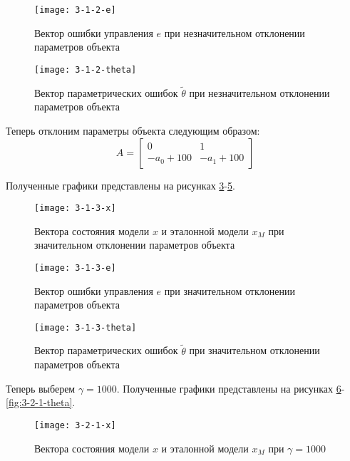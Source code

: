 \documentclass[14pt, a4paper]{extarticle}
\begin{document}
\begin{enumerate}
		\begin{figure}[H]
			\centering
			\texttt{[image: 3-1-2-e]}
			\caption{Вектор ошибки управления $e$ при незначительном отклонении параметров объекта}
			\label{fig:3-1-2-e}
		\end{figure}
		
		\begin{figure}[H]
			\centering
			\texttt{[image: 3-1-2-theta]}
			\caption{Вектор параметрических ошибок $\tilde{\theta}$ при незначительном отклонении параметров объекта}
			\label{fig:3-1-2-theta}
		\end{figure}
		
		Теперь отклоним параметры объекта следующим образом:
		$$A=\left[
		\begin{matrix}
			0 & 1 \\
			-a_0+100 & -a_1+100 
		\end{matrix}
		\right]$$
		
		Полученные графики представлены на рисунках \ref{fig:3-1-3-x}-\ref{fig:3-1-3-theta}. 
		
		\begin{figure}[H]
			\centering
			\texttt{[image: 3-1-3-x]}
			\caption{Вектора состояния модели $x$ и эталонной модели $x_M$ при значительном отклонении параметров объекта}
			\label{fig:3-1-3-x}
		\end{figure}
		
		\begin{figure}[H]
			\centering
			\texttt{[image: 3-1-3-e]}
			\caption{Вектор ошибки управления $e$ при значительном отклонении параметров объекта}
			\label{fig:3-1-3-e}
		\end{figure}
		
		\begin{figure}[H]
			\centering
			\texttt{[image: 3-1-3-theta]}
			\caption{Вектор параметрических ошибок $\tilde{\theta}$ при значительном отклонении параметров объекта}
			\label{fig:3-1-3-theta}
		\end{figure}
		
		Теперь выберем $\gamma=1000$. Полученные графики представлены на рисунках \ref{fig:3-2-1-x}-\ref{fig:3-2-1-theta}.
		
		\begin{figure}[H]
			\centering
			\texttt{[image: 3-2-1-x]}
			\caption{Вектора состояния модели $x$ и эталонной модели $x_M$ при $\gamma=1000$}
			\label{fig:3-2-1-x}
		\end{figure}
		

\end{enumerate}
\end{document}
